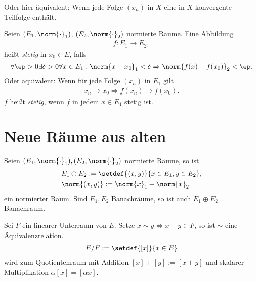 \begin{defn}
\begin{defnenum}
 Oder hier äquivalent: Wenn jede Folge $(x_n)$ in $X$ eine in $X$ konvergente
 Teilfolge enthält.
 \item Seien $(E_1,\norm{\cdot}_1)$, $(E_2,\norm{\cdot}_2)$ normierte Räume.
 Eine Abbildung
 \begin{align*}
 f: E_1\to E_2,
 \end{align*}
heißt \emph{stetig} in $x_0\in E$, falls
\begin{align*}
\forall \ep > 0 \exists \delta > 0 \forall x \in E_1: \norm{x-x_0}_1 < \delta
\Rightarrow \norm{f(x)-f(x_0)}_2 < \ep.
\end{align*}
Oder äquivalent: Wenn für jede Folge $(x_n)$ in $E_1$ gilt
\begin{align*}
x_n \to x_0 \Rightarrow f(x_n)\to f(x_0).
\end{align*}
$f$ heißt \emph{stetig}, wenn $f$ in jedem $x\in E_1$ stetig
ist.\fishhere
\end{defnenum}
\end{defn}

\section{Neue Räume aus alten}

\begin{defn}
\label{defn:1.13}
Seien $(E_1,\norm{\cdot}_1),(E_2,\norm{\cdot}_2)$ normierte Räume, so ist
\begin{align*}
&E_1\oplus E_2 := \setdef{(x,y)}{x\in E_1,y\in E_2},\\
&\norm{(x,y)} := \norm{x}_1 + \norm{x}_2
\end{align*}
ein normierter Raum. Sind $E_1,E_2$ Banachräume,
so ist auch $E_1\oplus E_2$ Banachraum.\fishhere
\end{defn}

\begin{defn}[Quotientenraum]
\label{defn:1.14}
Sei $F$ ein linearer Unterraum von $E$. Setze $x\sim y\Leftrightarrow x-y\in
F$, so ist $\sim$ eine Äquivalenzrelation.
\begin{align*}
E/F  := \setdef{[x]}{x\in E}
\end{align*}
wird zum Quotientenraum mit Addition
$[x]+[y]:=[x+y]$ und skalarer Multiplikation $\alpha[x]=[\alpha x]$.\fishhere
\end{defn}

